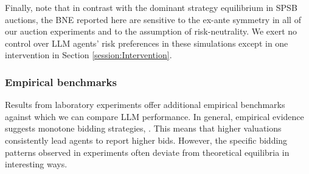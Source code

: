 \documentclass{article} %
\newcommand{\kibitz}[2]{\ifnum\Comments=1{\color{#1}{#2}}\fi}
\newcommand{\avs}[1]{\kibitz{purple}{[avs: #1]}}
\begin{document}


Finally, note that in contrast with the dominant strategy equilibrium in SPSB auctions, the BNE reported here are sensitive to the ex-ante symmetry in all of our auction experiments and to the
assumption of risk-neutrality. We exert no control over LLM agents’ risk preferences in these
simulations except in one intervention in Section \ref{session:Intervention}.

\subsubsection{Empirical benchmarks}

Results from laboratory experiments offer additional empirical benchmarks against which we can compare LLM performance. In general, empirical evidence suggests
monotone bidding strategies\cite{kagel1993independent}, \cite{kagel2020handbook}. This means that higher
valuations consistently lead agents to report higher bids. However, the specific bidding patterns
observed in experiments often deviate from theoretical equilibria in interesting ways.
\end{document}
